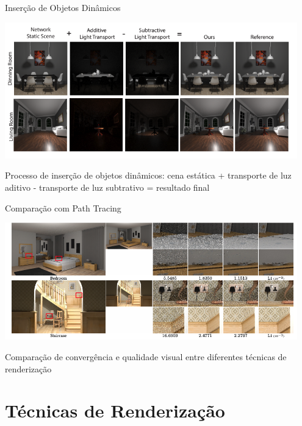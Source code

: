 \documentclass[aspectratio=169,xcolor=table]{beamer}
\begin{document}
\begin{frame}{Inserção de Objetos Dinâmicos}
    \begin{center}
        \includegraphics[width=0.95\textwidth]{insercao-objetos-dinamicos}
    \end{center}
    \begin{center}
        \small{Processo de inserção de objetos dinâmicos: cena estática + transporte de luz aditivo - transporte de luz subtrativo = resultado final}
    \end{center}
\end{frame}

\begin{frame}{Comparação com Path Tracing}
    \begin{center}
        \includegraphics[width=0.95\textwidth]{comparacao-path-tracing}
    \end{center}
    \begin{center}
        \small{Comparação de convergência e qualidade visual entre diferentes técnicas de renderização}
    \end{center}
\end{frame}

\section{Técnicas de Renderização}
\end{document}
